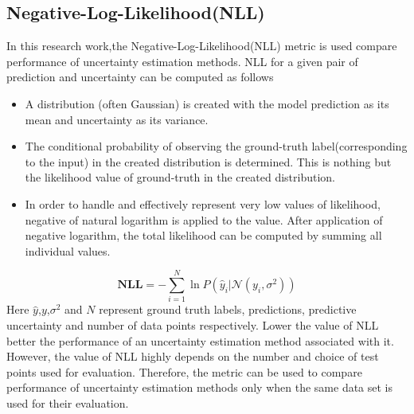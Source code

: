 \subsection{Negative-Log-Likelihood(NLL)}
In this research work,the Negative-Log-Likelihood(NLL) metric is used compare performance of uncertainty estimation methods. NLL for a given pair of prediction and uncertainty can be computed as follows
\begin{itemize}
	\item A distribution (often Gaussian) is created with the model prediction as its mean and uncertainty as its variance.
	\item The conditional probability of observing the ground-truth label(corresponding to the input) in the created distribution is determined. This is nothing but the likelihood value of ground-truth in the created distribution.
	\item  In order to handle and effectively represent very low values of likelihood, negative of natural logarithm is applied  to the value. After application of negative logarithm, the total likelihood can be computed by summing all individual values.
\end{itemize}
\begin{equation}
	\mathbf{NLL} = -\sum_{i=1}^{N}\ln P(\hat{y}_i|\mathcal{N}(y_i,\sigma^2)) 
\end{equation}
Here $\hat{y}$,$y$,$\sigma^2$ and $N$ represent ground truth labels, predictions, predictive uncertainty and number of data points respectively.
Lower the value of NLL better the performance of an uncertainty estimation method associated with it. However, the value of NLL highly depends on the number and choice of test points used for evaluation. Therefore, the metric can be used to compare performance of uncertainty estimation methods only when the same data set is used for their evaluation.
